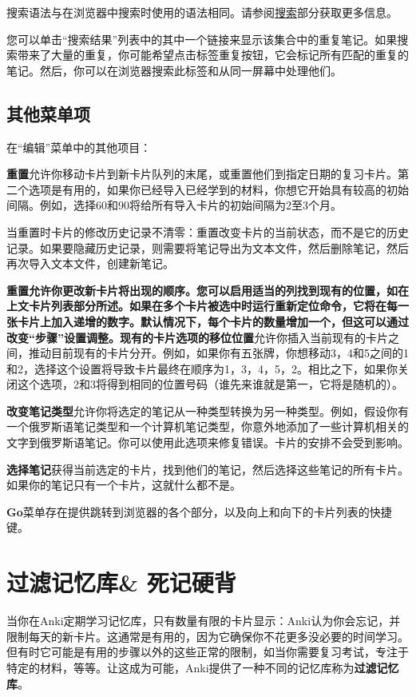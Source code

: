 \documentclass[a4paper]{book}
\begin{document}
		搜索语法与在浏览器中搜索时使用的语法相同。请参阅\hyperref[searching]{搜索}部分获取更多信息。
		
		您可以单击“搜索结果”列表中的其中一个链接来显示该集合中的重复笔记。如果搜索带来了大量的重复，你可能希望点击标签重复按钮，它会标记所有匹配的重复的笔记。然后，你可以在浏览器搜索此标签和从同一屏幕中处理他们。
		
		\section{其他菜单项}
		在“编辑”菜单中的其他项目：
		
		\textbf{重置}允许你移动卡片到新卡片队列的末尾，或重置他们到指定日期的复习卡片。第二个选项是有用的，如果你已经导入已经学到的材料，你想它开始具有较高的初始间隔。例如，选择60和90将给所有导入卡片的初始间隔为2至3个月。
		
		当重置时卡片的修改历史记录不清零：重置改变卡片的当前状态，而不是它的历史记录。如果要隐藏历史记录，则需要将笔记导出为文本文件，然后删除笔记，然后再次导入文本文件，创建新笔记。
		
		\textbf{重置允许你更改新卡片将出现的顺序。您可以启用适当的列找到现有的位置，如在上文卡片列表部分所述。如果在多个卡片被选中时运行重新定位命令，它将在每一张卡片上加入递增的数字。默认情况下，每个卡片的数量增加一个，但这可以通过改变“步骤”设置调整。现有的卡片选项的移位位置}允许你插入当前现有的卡片之间，推动目前现有的卡片分开。例如，如果你有五张牌，你想移动3，4和5之间的1和2，选择这个设置将导致卡片最终在顺序为1，3，4，5，2。相比之下，如果你关闭这个选项，2和3将得到相同的位置号码（谁先来谁就是第一，它将是随机的）。
		
		\textbf{改变笔记类型}允许你将选定的笔记从一种类型转换为另一种类型。例如，假设你有一个俄罗斯语笔记类型和一个计算机笔记类型，你意外地添加了一些计算机相关的文字到俄罗斯语笔记。你可以使用此选项来修复错误。卡片的安排不会受到影响。
		
		\textbf{选择笔记}获得当前选定的卡片，找到他们的笔记，然后选择这些笔记的所有卡片。如果你的笔记只有一个卡片，这就什么都不是。
		
		\textbf{Go}菜单存在提供跳转到浏览器的各个部分，以及向上和向下的卡片列表的快捷键。
		
		\chapter{过滤记忆库\& 死记硬背}
		
		当你在Anki定期学习记忆库，只有数量有限的卡片显示：Anki认为你会忘记，并限制每天的新卡片。这通常是有用的，因为它确保你不花更多没必要的时间学习。但有时它可能是有用的步骤以外的这些正常的限制，如当你需要复习考试，专注于特定的材料，等等。让这成为可能，Anki提供了一种不同的记忆库称为\textbf{过滤记忆库}。
		
\end{document}
